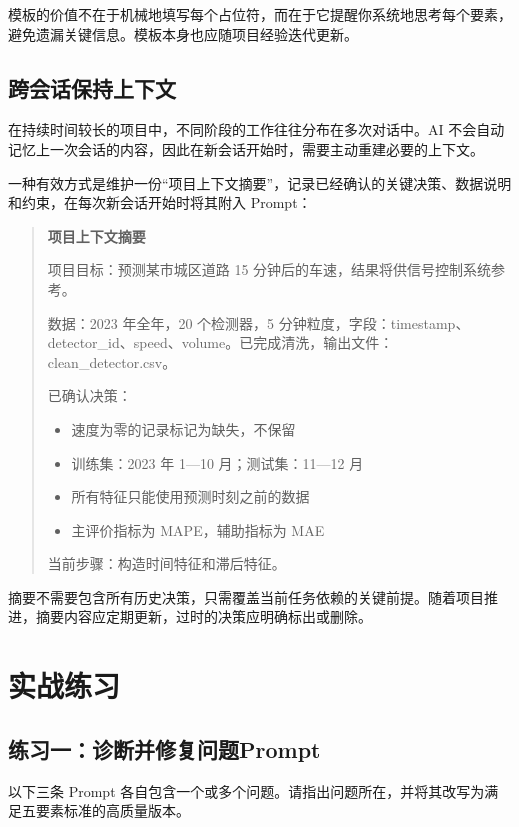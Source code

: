 模板的价值不在于机械地填写每个占位符，而在于它提醒你系统地思考每个要素，避免遗漏关键信息。模板本身也应随项目经验迭代更新。

\subsection{跨会话保持上下文}

在持续时间较长的项目中，不同阶段的工作往往分布在多次对话中。AI 不会自动记忆上一次会话的内容，因此在新会话开始时，需要主动重建必要的上下文。

一种有效方式是维护一份“项目上下文摘要”，记录已经确认的关键决策、数据说明和约束，在每次新会话开始时将其附入 Prompt：

\begin{quote}
\textbf{项目上下文摘要}

项目目标：预测某市城区道路 15 分钟后的车速，结果将供信号控制系统参考。

数据：2023 年全年，20 个检测器，5 分钟粒度，字段：timestamp、detector\_id、speed、volume。已完成清洗，输出文件：clean\_detector.csv。

已确认决策：
\begin{itemize}
  \item 速度为零的记录标记为缺失，不保留
  \item 训练集：2023 年 1—10 月；测试集：11—12 月
  \item 所有特征只能使用预测时刻之前的数据
  \item 主评价指标为 MAPE，辅助指标为 MAE
\end{itemize}

当前步骤：构造时间特征和滞后特征。
\end{quote}

摘要不需要包含所有历史决策，只需覆盖当前任务依赖的关键前提。随着项目推进，摘要内容应定期更新，过时的决策应明确标出或删除。

\section{实战练习}

\subsection*{练习一：诊断并修复问题Prompt}

以下三条 Prompt 各自包含一个或多个问题。请指出问题所在，并将其改写为满足五要素标准的高质量版本。

